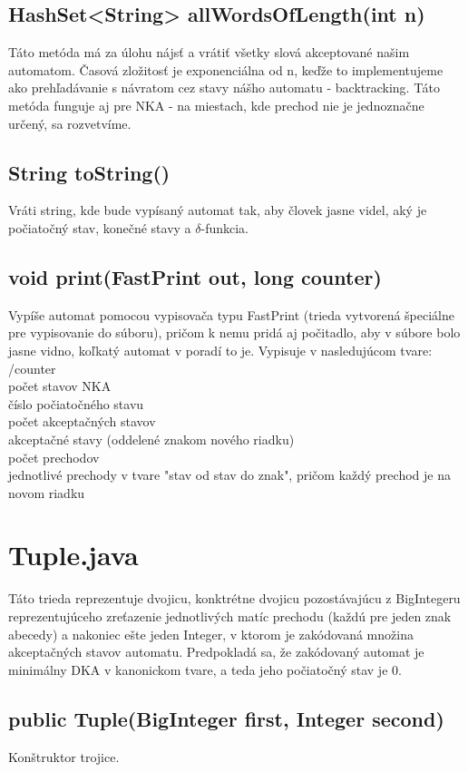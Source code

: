 \subsection*{HashSet<String> allWordsOfLength(int n)}
Táto metóda má za úlohu nájsť a vrátiť všetky slová akceptované našim automatom. Časová zložitosť je exponenciálna od n, keďže to implementujeme ako prehľadávanie s návratom cez stavy nášho automatu - backtracking. Táto metóda funguje aj pre NKA - na miestach, kde prechod nie je jednoznačne určený, sa rozvetvíme.

\subsection*{String toString()}
Vráti string, kde bude vypísaný automat tak, aby človek jasne videl, aký je počiatočný stav, konečné stavy a $\delta$-funkcia.

\subsection*{void print(FastPrint out, long counter)}
Vypíše automat pomocou vypisovača typu FastPrint (trieda vytvorená špeciálne pre vypisovanie do súboru), pričom k nemu pridá aj počitadlo, aby v súbore bolo jasne vidno, koľkatý automat v poradí to je. Vypisuje v nasledujúcom tvare: 
\\
/counter
\\
počet stavov NKA
\\
číslo počiatočného stavu
\\
počet akceptačných stavov
\\ akceptačné stavy (oddelené znakom nového riadku)
\\ počet prechodov
\\ jednotlivé prechody v tvare "stav od stav do znak", pričom každý prechod je na novom riadku

\section{Tuple.java}
Táto trieda reprezentuje dvojicu, konktrétne dvojicu pozostávajúcu z BigIntegeru reprezentujúceho zreťazenie jednotlivých matíc prechodu (každú pre jeden znak abecedy) a nakoniec ešte jeden Integer, v ktorom je zakódovaná množina akceptačných stavov automatu. Predpokladá sa, že zakódovaný automat je minimálny DKA v kanonickom tvare, a teda jeho počiatočný stav je 0. 

\subsection{public Tuple(BigInteger first, Integer second)}
Konštruktor trojice.

